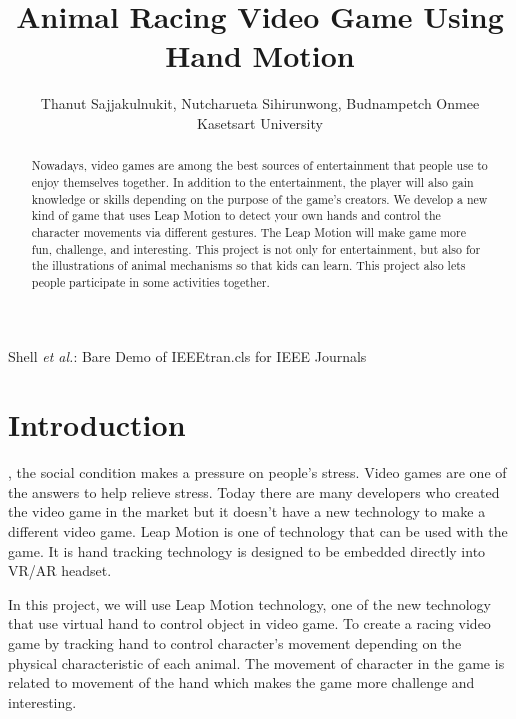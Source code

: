 \documentclass[journal]{IEEEtran}										    %
\title{\textbf{Animal Racing Video Game Using Hand Motion}}
\author{Thanut Sajjakulnukit, Nutcharueta Sihirunwong, Budnampetch Onmee \\
    \Large Kasetsart University }
\begin{document}
    {Shell \MakeLowercase{\textit{et al.}}: Bare Demo of IEEEtran.cls for IEEE Journals}
    \maketitle
    
    \begin{abstract}                                                        %
        Nowadays, video games are among the best sources of entertainment 
        that people use to enjoy themselves together. In addition to the 
        entertainment, the player will also gain knowledge or skills 
        depending on the purpose of the game’s creators. We  develop a new 
        kind of game that uses Leap Motion to detect your own hands and 
        control the character movements via different gestures. 
        The Leap Motion will make game more fun, challenge, and interesting. 
        This project is not only for entertainment, but also for the 
        illustrations of animal mechanisms so that kids can learn. 
        This project also lets people participate in some activities together.

    \end{abstract}

    \section{Introduction}                                                  %
        , the social condition makes a pressure 
        on people’s stress. Video games are one of the answers to help relieve 
        stress. Today there are many developers who created the video 
        game in the market but it doesn't have a new technology to make 
        a different video game. Leap Motion is one of technology that 
        can be used with the game. It is hand tracking technology is 
        designed to be embedded directly into VR/AR headset. 

        In this project, we will use Leap Motion technology, one of
        the new technology that use virtual hand to control object
        in video game. To create a racing video game by tracking 
        hand to control character’s movement depending on the 
        physical characteristic of each animal. The movement of 
        character in the game is related to movement of the hand 
        which makes the game more challenge and interesting.
        
\end{document}
